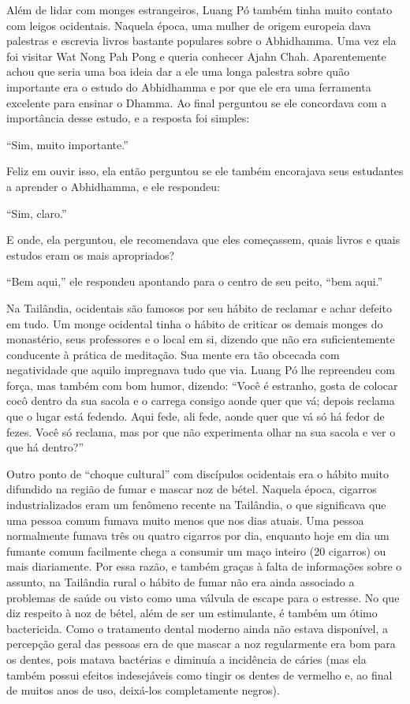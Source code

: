 Além de lidar com monges estrangeiros, Luang Pó também tinha muito
contato com leigos ocidentais. Naquela época, uma mulher de origem
europeia dava palestras e escrevia livros bastante populares sobre o
Abhidhamma. Uma vez ela foi visitar Wat Nong Pah Pong e queria conhecer
Ajahn Chah. Aparentemente achou que seria uma boa ideia dar a ele uma
longa palestra sobre quão importante era o estudo do Abhidhamma e por
que ele era uma ferramenta excelente para ensinar o Dhamma. Ao final
perguntou se ele concordava com a importância desse estudo, e a resposta
foi simples:

``Sim, muito importante.''

Feliz em ouvir isso, ela então perguntou se ele também encorajava seus
estudantes a aprender o Abhidhamma, e ele respondeu:

``Sim, claro.''

E onde, ela perguntou, ele recomendava que eles começassem, quais livros
e quais estudos eram os mais apropriados?

``Bem aqui,'' ele respondeu apontando para o centro de seu peito, ``bem
aqui.''

Na Tailândia, ocidentais são famosos por seu hábito de reclamar e achar
defeito em tudo. Um monge ocidental tinha o hábito de criticar os demais
monges do monastério, seus professores e o local em si, dizendo que não
era suficientemente conducente à prática de meditação. Sua mente era tão
obcecada com negatividade que aquilo impregnava tudo que via. Luang Pó
lhe repreendeu com força, mas também com bom humor, dizendo: ``Você é
estranho, gosta de colocar cocô dentro da sua sacola e o carrega consigo
aonde quer que vá; depois reclama que o lugar está fedendo. Aqui fede,
ali fede, aonde quer que vá só há fedor de fezes. Você só reclama, mas
por que não experimenta olhar na sua sacola e ver o que há dentro?''

Outro ponto de ``choque cultural'' com discípulos ocidentais era o
hábito muito difundido na região de fumar e mascar noz de bétel. Naquela
época, cigarros industrializados eram um fenômeno recente na Tailândia,
o que significava que uma pessoa comum fumava muito menos que nos dias
atuais. Uma pessoa normalmente fumava três ou quatro cigarros por dia,
enquanto hoje em dia um fumante comum facilmente chega a consumir um
maço inteiro (20 cigarros) ou mais diariamente. Por essa razão, e também
graças à falta de informações sobre o assunto, na Tailândia rural o
hábito de fumar não era ainda associado a problemas de saúde ou visto
como uma válvula de escape para o estresse. No que diz respeito à noz de
bétel, além de ser um estimulante, é também um ótimo bactericida. Como o
tratamento dental moderno ainda não estava disponível, a percepção geral
das pessoas era de que mascar a noz regularmente era bom para os dentes,
pois matava bactérias e diminuía a incidência de cáries (mas ela também
possui efeitos indesejáveis como tingir os dentes de vermelho e, ao
final de muitos anos de uso, deixá-los completamente negros).

